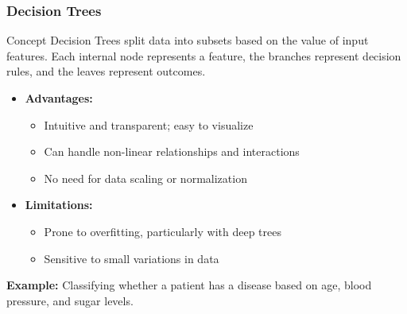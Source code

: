 \documentclass[aspectratio=169]{beamer}
\begin{document}
\begin{frame}[fragile]
    \frametitle{Decision Trees}
    \begin{block}{Concept}
        Decision Trees split data into subsets based on the value of input features. Each internal node represents a feature, 
        the branches represent decision rules, and the leaves represent outcomes.
    \end{block}

    \begin{itemize}
        \item \textbf{Advantages:}
        \begin{itemize}
            \item Intuitive and transparent; easy to visualize
            \item Can handle non-linear relationships and interactions
            \item No need for data scaling or normalization
        \end{itemize}
        
        \item \textbf{Limitations:}
        \begin{itemize}
            \item Prone to overfitting, particularly with deep trees
            \item Sensitive to small variations in data
        \end{itemize}
    \end{itemize}
    
    \textbf{Example:} Classifying whether a patient has a disease based on age, blood pressure, and sugar levels.
\end{frame}
\end{document}
